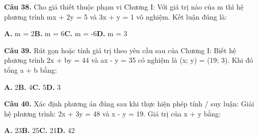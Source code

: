 \documentclass[11pt,a4paper]{article}
\begin{document}
\textbf{\color{primary} Câu 38.} Cho giả thiết thuộc phạm vi Chương I: Với giá trị nào của m thì hệ phương trình mx + 2y = 5 và 3x + y = 1 vô nghiệm. Kết luận đúng là:\par
\hspace*{1.5em}\textbf{A.} m = 2\quad\quad \textbf{B.} m = 6\quad\quad \textbf{C.} m = -6\quad\quad \textbf{D.} m = 3\par\vspace{2pt}
\textbf{\color{primary} Câu 39.} Rút gọn hoặc tính giá trị theo yêu cầu sau của Chương I: Biết hệ phương trình 2x + by = 44 và ax - y = 35 có nghiệm là (x; y) = (19; 3). Khi đó tổng a + b bằng:\par
\hspace*{1.5em}\textbf{A.} 2\quad\quad \textbf{B.} 4\quad\quad \textbf{C.} 5\quad\quad \textbf{D.} 3\par\vspace{2pt}
\textbf{\color{primary} Câu 40.} Xác định phương án đúng sau khi thực hiện phép tính / suy luận: Giải hệ phương trình: 2x + 3y = 48 và x - y = 19. Giá trị của x + y bằng:\par
\hspace*{1.5em}\textbf{A.} 23\quad\quad \textbf{B.} 25\quad\quad \textbf{C.} 21\quad\quad \textbf{D.} 42\par\vspace{2pt}
\end{document}
